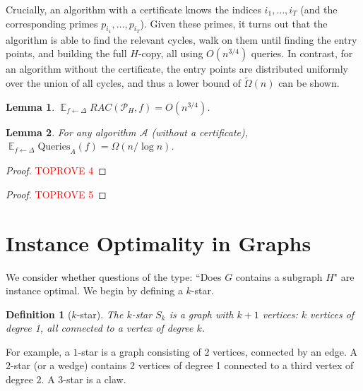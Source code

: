 \documentclass[11pt]{article}
\numberwithin{equation}{section}
\newtheorem{lemma}[lemma]{Lemma}
\newtheorem{definition}[definition]{Definition}
\newcommand\E{\mathop{\mathbb E}}
\newcommand{\Query}{\text{Queries}}
\renewcommand{\P}{\mathcal{P}}
\newcommand{\kstar}[1]{\ensuremath{#1}-star}
\newcommand{\1}{\mathbf{1}}
\newcommand{\A}{\mathcal A}
\begin{document}
Crucially, an algorithm with a certificate knows the indices $i_1, \ldots, i_T$ (and the corresponding primes $p_{i_1}, \ldots, p_{i_T}$). Given these primes, it turns out that the algorithm is able to find the relevant cycles, walk on them until finding the entry points, and building the full $H$-copy, all using $O(n^{3/4})$ queries. In contrast, for an algorithm without the certificate, the entry points are distributed uniformly over the union of all cycles, and thus a lower bound of $\tilde\Omega(n)$ can be shown.

\begin{lemma} \label{fixedpointupper}
$\E_{f \leftarrow \Delta} RAC(\P_H, f) = O(n^{3/4})$.
\end{lemma}


\begin{lemma} \label{fixedpointlower}
For any algorithm $\A$ (without a certificate), $\E_{f \leftarrow \Delta} \Query_A(f) = \Omega(n / \log n)$.
\end{lemma}

\begin{proof}\textcolor{red}{TOPROVE 4}\end{proof}

\begin{proof}\textcolor{red}{TOPROVE 5}\end{proof}






 \section{Instance Optimality in Graphs} \label{sec:5}



We consider whether questions of the type: ``Does $G$ contains a subgraph $H$" are instance optimal.
 We begin by defining a \kstar{k}.
 
 \begin{definition} [\kstar{k}]
The \emph{\kstar{k}} $S_k$ is a graph with $k+1$ vertices: $k$ vertices of degree 1, all connected to a vertex of degree $k$.
 \end{definition}
 
  For example, a \kstar{1} is a graph consisting of 2 vertices, connected by an edge. A \kstar{2} (or a wedge) contains 2 vertices of degree 1 connected to a third vertex of degree 2. A \kstar{3} is a claw. 
\end{document}
